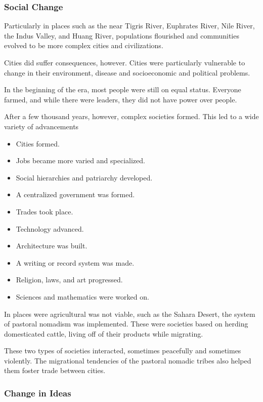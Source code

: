 \documentclass[11pt]{article}
\begin{document}
\subsubsection{Social Change}
\label{sec:orga11b828}

Particularly in places such as the near Tigris River, Euphrates River, Nile River, the Indus Valley, and Huang River, populations flourished and communities evolved to be more complex cities and civilizations.

Cities did suffer consequences, however. Cities were particularly vulnerable to change in their environment, disease and socioeconomic and political problems.

In the beginning of the era, most people were still on equal status. Everyone farmed, and while there were leaders, they did not have power over people.

After a few thousand years, however, complex societies formed. This led to a wide variety of advancements

\begin{itemize}
\item Cities formed.
\item Jobs became more varied and specialized.
\item Social hierarchies and patriarchy developed.
\item A centralized government was formed.
\item Trades took place.
\item Technology advanced.
\item Architecture was built.
\item A writing or record system was made.
\item Religion, laws, and art progressed.
\item Sciences and mathematics were worked on.
\end{itemize}

In places were agricultural was not viable, such as the Sahara Desert, the system of pastoral nomadism was implemented. These were societies based on herding domesticated cattle, living off of their products while migrating.

These two types of societies interacted, sometimes peacefully and sometimes violently. The migrational tendencies of the pastoral nomadic tribes also helped them foster trade between cities.

\subsubsection{Change in Ideas}
\label{sec:org4a050d4}
\end{document}
